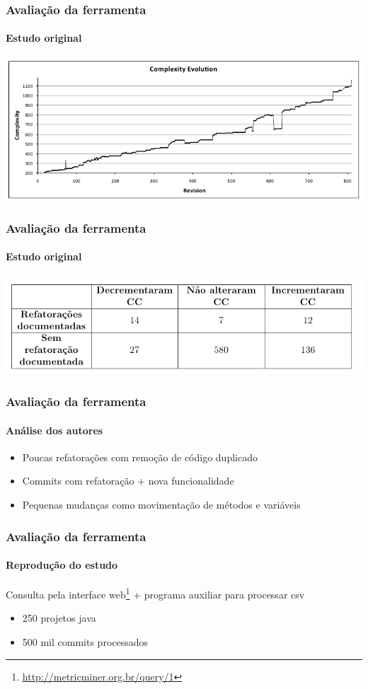 \documentclass[brazil]{beamer}
\begin{document}
	\begin{frame}
		\frametitle{Avaliação da ferramenta}
		\framesubtitle{Estudo original}
		\includegraphics[width=1.00\textwidth]{img/cc-soetens.png}
	\end{frame}

	\begin{frame}
		\frametitle{Avaliação da ferramenta}
		\framesubtitle{Estudo original}
		\includegraphics[width=1.00\textwidth]{img/tabela-soetens.png}
	\end{frame}

	\begin{frame}
		\frametitle{Avaliação da ferramenta}
		\framesubtitle{Análise dos autores}
		\begin{itemize}
			\item Poucas refatorações com remoção de código duplicado
			\item Commits com refatoração + nova funcionalidade
			\item Pequenas mudanças como movimentação de métodos e variáveis
		\end{itemize}
	\end{frame}

	\begin{frame}
		\frametitle{Avaliação da ferramenta}
		\framesubtitle{Reprodução do estudo}
		Consulta pela interface web\footnote{\url{http://metricminer.org.br/query/1}} + programa auxiliar para processar csv
		\begin{itemize}
			\item 250 projetos java
			\item 500 mil commits processados
		\end{itemize}
	\end{frame}
\end{document}
